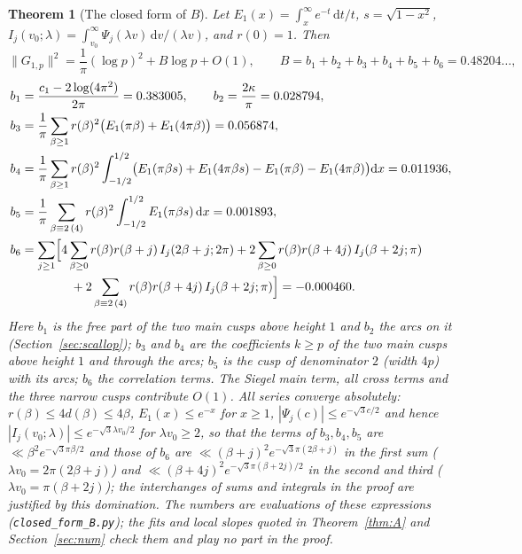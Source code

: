 \documentclass[11pt]{amsart}
\newtheorem{theorem}{Theorem}[section]
\theoremstyle{remark}
\newcommand{\dd}{\mathrm{d}}
\begin{document}
\begin{theorem}[The closed form of $B$]\label{thm:closedB}
Let $E_1(x)=\int_x^\infty e^{-t}\,\dd t/t$, $s=\sqrt{1-x^2}$, $I_j(v_0;\lambda)=\int_{v_0}^\infty\Psi_j(\lambda v)\,\dd v/(\lambda v)$, and $r(0)=1$. Then
\[
\|G_{1,p}\|^2=\frac1\pi(\log p)^2+B\log p+O(1),\qquad B=b_1+b_2+b_3+b_4+b_5+b_6=0.48204\ldots,
\]
\begin{align*}
b_1&=\frac{c_1-2\log(4\pi^2)}{2\pi}=0.383005,\qquad b_2=\frac{2\kappa}\pi=0.028794,\\
b_3&=\frac1\pi\sum_{\beta\ge1}r(\beta)^2\bigl(E_1(\pi\beta)+E_1(4\pi\beta)\bigr)=0.056874,\\
b_4&=\frac1\pi\sum_{\beta\ge1}r(\beta)^2\int_{-1/2}^{1/2}\bigl(E_1(\pi\beta s)+E_1(4\pi\beta s)-E_1(\pi\beta)-E_1(4\pi\beta)\bigr)\dd x=0.011936,\\
b_5&=\frac1\pi\sum_{\beta\equiv2\,(4)}r(\beta)^2\int_{-1/2}^{1/2}E_1(\pi\beta s)\,\dd x=0.001893,\\
b_6&=\sum_{j\ge1}\Bigl[4\sum_{\beta\ge0}r(\beta)r(\beta+j)\,I_j(2\beta+j;2\pi)+2\sum_{\beta\ge0}r(\beta)r(\beta+4j)\,I_j(\beta+2j;\pi)\\
&\hskip4em+2\sum_{\beta\equiv2\,(4)}r(\beta)r(\beta+4j)\,I_j(\beta+2j;\pi)\Bigr]=-0.000460.
\end{align*}
Here $b_1$ is the free part of the two main cusps above height $1$ and $b_2$ the arcs on it (Section~\ref{sec:scallop}); $b_3$ and $b_4$ are the coefficients $k\ge p$ of the two main cusps above height $1$ and through the arcs; $b_5$ is the cusp of denominator $2$ (width $4p$) with its arcs; $b_6$ the correlation terms. The Siegel main term, all cross terms and the three narrow cusps contribute $O(1)$. All series converge absolutely: $r(\beta)\le4d(\beta)\le4\beta$, $E_1(x)\le e^{-x}$ for $x\ge1$, $|\Psi_j(c)|\le e^{-\sqrt3c/2}$ and hence $|I_j(v_0;\lambda)|\le e^{-\sqrt3\lambda v_0/2}$ for $\lambda v_0\ge2$, so that the terms of $b_3,b_4,b_5$ are $\ll\beta^2e^{-\sqrt3\pi\beta/2}$ and those of $b_6$ are $\ll(\beta+j)^2e^{-\sqrt3\pi(2\beta+j)}$ in the first sum ($\lambda v_0=2\pi(2\beta+j)$) and $\ll(\beta+4j)^2e^{-\sqrt3\pi(\beta+2j)/2}$ in the second and third ($\lambda v_0=\pi(\beta+2j)$); the interchanges of sums and integrals in the proof are justified by this domination. The numbers are evaluations of these expressions (\texttt{closed\_form\_B.py}); the fits and local slopes quoted in Theorem~\ref{thm:A} and Section~\ref{sec:num} check them and play no part in the proof.
\end{theorem}
\end{document}
